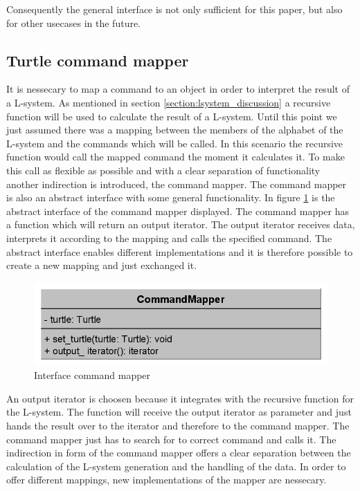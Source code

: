 \documentclass[english]{cpp-hmwk}
\begin{document}
Consequently the general interface is not only sufficient for this paper, but also for other usecases in the future.

\subsection{Turtle command mapper}
\label{section:turtle_mapping}
It is nessecary to map a command to an object in order to interpret the result of a L-system. As mentioned in section \ref{section:lsystem_discussion} a recursive function will be used to calculate the result of a L-system. Until this point we just assumed there was a mapping between the members of the alphabet of the L-system and the commands which will be called. In this scenario the recursive function would call the mapped command the moment it calculates it. To make this call as flexible as possible and with a clear separation of functionality another indirection is introduced, the command mapper.
The command mapper is also an abstract interface with some general functionality. In figure \ref{figure:if_command_map} is the abstract interface of the command mapper displayed. The command mapper has a function which will return an output iterator. The output iterator receives data, interprets it according to the mapping and calls the specified command. The abstract interface enables different implementations and it is therefore possible to create a new mapping and just exchanged it.

\begin{figure}[h!]
	\centering
	\includegraphics[width=0.7\columnwidth]{../graphs/LSystem/examples/class_command_mapping.png}
	\caption{Interface command mapper}
	\label{figure:if_command_map}
\end{figure}

An output iterator is choosen because it integrates with the recursive function for the L-system. The function will receive the output iterator as parameter and just hands the result over to the iterator and therefore to the command mapper. The command mapper just has to search for to correct command and calls it.
The indirection in form of the command mapper offers a clear separation between the calculation of the L-system generation and the handling of the data. In order to offer different mappings, new implementations of the mapper are nessecary.
\end{document}
